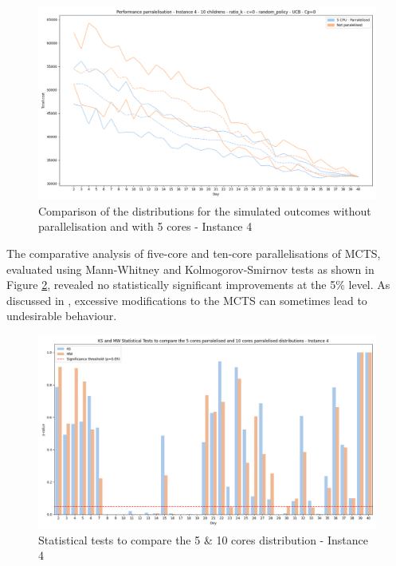 \begin{figure}[!ht]
    \centering
    \includegraphics[width=.4\textwidth]{Figures/4 - Paralelised vs 5 CPU paralelised.png}
    \caption{Comparison of the distributions for the simulated outcomes without parallelisation and with 5 cores - Instance 4}
    \label{fig:sim_perf_parral_4}
\end{figure}


The comparative analysis of five-core and ten-core parallelisations of MCTS, evaluated using Mann-Whitney and Kolmogorov-Smirnov tests as shown in Figure \ref{fig:Stats test 5 VS 10 Parall}, revealed no statistically significant improvements at the 5\% level. As discussed in \cite{different_selection_policies}, excessive modifications to the MCTS can sometimes lead to undesirable behaviour.

\begin{figure}[!ht]
    \centering
    \includegraphics[width=.4\textwidth]{Figures/4 - Distribution stats tests 5P vs 10P.png}
    \caption{Statistical tests to compare the 5 \& 10 cores distribution - Instance 4}
    \label{fig:Stats test 5 VS 10 Parall}
\end{figure}
